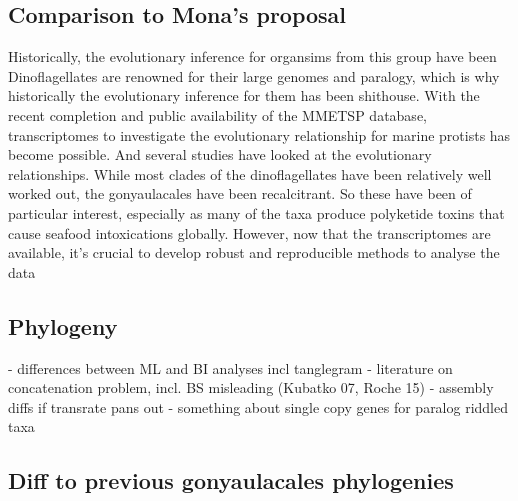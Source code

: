 \documentclass[12pt]{article}
\begin{document}
\subsection*{Comparison to Mona's proposal}

Historically, the evolutionary inference for organsims from this group have been 
Dinoflagellates are renowned for their large genomes and paralogy, which is why historically the evolutionary inference for them has been shithouse. With the recent completion and public availability of the MMETSP database, transcriptomes to investigate the evolutionary relationship for marine protists has become possible. And several studies have looked at the evolutionary relationships. While most clades of the dinoflagellates have been relatively well worked out, the gonyaulacales have been recalcitrant. So these have been of particular interest, especially as many of the taxa produce polyketide toxins that cause seafood intoxications globally. However, now that the transcriptomes are available, it's crucial to develop robust and reproducible methods to analyse the data
\subsection*{Phylogeny}
- differences between ML and BI analyses incl tanglegram
- literature on concatenation problem, incl. BS misleading (Kubatko 07, Roche 15)
- assembly diffs if transrate pans out
- something about single copy genes for paralog riddled taxa

\subsection*{Diff to previous gonyaulacales phylogenies}
\end{document}
